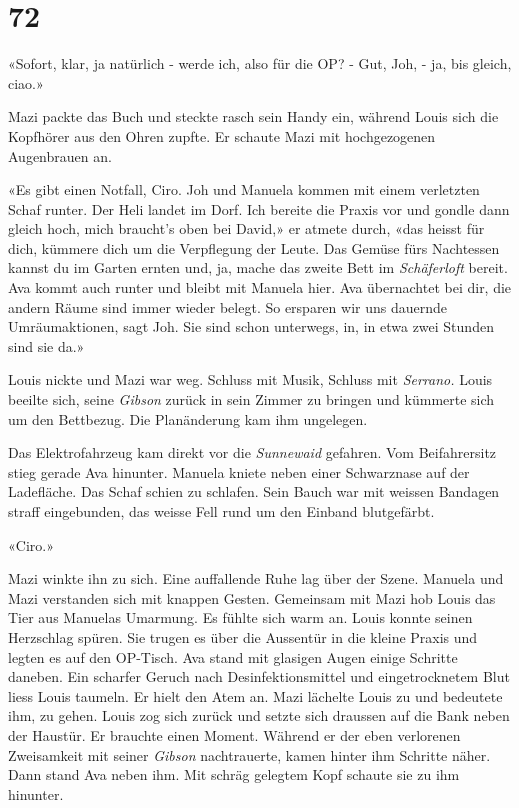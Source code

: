 \chapter{72}



«Sofort, klar, ja natürlich - werde ich, also für die OP? - Gut, Joh, -  ja, bis
gleich, ciao.»

Mazi packte das Buch und steckte rasch sein Handy ein, während  Louis sich die Kopfhörer aus
den Ohren zupfte. Er schaute Mazi mit hochgezogenen Augenbrauen an.

«Es gibt einen Notfall, Ciro. Joh und Manuela kommen mit einem
verletzten Schaf runter. Der Heli landet im Dorf. Ich bereite die Praxis vor und gondle dann
gleich hoch, mich braucht’s oben bei David,» er atmete durch, «das heisst
für dich, kümmere dich um die Verpflegung der Leute. Das Gemüse fürs
Nachtessen kannst du im Garten ernten und, ja, mache das zweite Bett im \emph{Schäferloft} bereit. Ava kommt auch runter und bleibt mit
Manuela hier. Ava übernachtet bei dir, die andern Räume sind immer wieder belegt. 
So ersparen wir uns dauernde Umräumaktionen, sagt Joh. 
Sie sind schon unterwegs, in, in etwa zwei Stunden sind sie da.»

Louis nickte und Mazi war weg. 
Schluss mit Musik, Schluss mit \emph{Serrano.} Louis beeilte sich, seine
\emph{Gibson} zurück in sein Zimmer zu bringen und kümmerte sich um den
Bettbezug. Die Planänderung kam ihm ungelegen. 

\sectionbreak

Das Elektrofahrzeug kam direkt vor die \emph{Sunnewaid} gefahren. Vom
Beifahrersitz stieg gerade Ava hinunter. Manuela kniete neben einer
Schwarznase auf der Ladefläche. Das Schaf schien zu schlafen. Sein Bauch
war mit weissen Bandagen straff eingebunden, das weisse Fell rund um den
Einband blutgefärbt.

«Ciro.»

Mazi winkte ihn zu sich. Eine auffallende Ruhe lag über der Szene. Manuela und Mazi verstanden sich mit knappen
Gesten. Gemeinsam mit Mazi hob Louis das Tier aus Manuelas Umarmung. Es fühlte sich warm an. Louis konnte seinen
Herzschlag spüren. Sie trugen es über die Aussentür in die kleine
Praxis und legten es auf den OP-Tisch. Ava stand mit glasigen Augen
einige Schritte daneben. Ein scharfer Geruch nach Desinfektionsmittel
und eingetrocknetem Blut liess Louis taumeln. Er hielt
den Atem an. Mazi lächelte Louis zu und bedeutete ihm, zu gehen. Louis
zog sich zurück und setzte sich draussen auf die Bank neben der Haustür.
Er brauchte einen Moment. Während er der eben verlorenen Zweisamkeit mit
seiner \emph{Gibson} nachtrauerte, kamen hinter ihm Schritte näher. Dann
stand Ava neben ihm. Mit schräg gelegtem Kopf schaute sie zu ihm
hinunter. 

